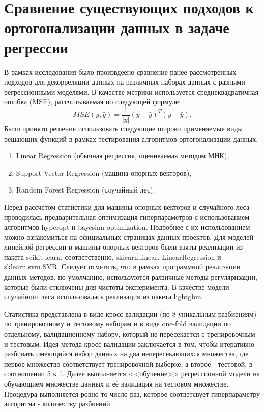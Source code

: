 \documentclass[runningheads]{llncs}
\begin{document}
\newpage
\section*{Сравнение существующих подходов к ортогонализации данных в задаче регрессии}
\hspace{0.4cm}
В рамках исследования было произвдеено сравнение ранее рассмотренных подходов для декорреляции данных на различных наборах данных с разными регрессионными моделями. В качестве метрики используется среднеквадратичная ошибка (MSE), рассчитываемая по следующей формуле: $$MSE(y, \hat{y}) = \frac{1}{|y|}(y - \hat{y})^T(y - \hat{y}).$$ Было принято решение использовать следующие широко применяемые виды решающих функций в рамках тестирования алгоритмов ортогонализации данных, \par
\begin{enumerate}
  \item Linear Regression (обычная регрессия, оцениваемая методом МНК), 
  \item Support Vector Regression (машина опорных векторов),
  \item Random Forest Regression (случайный лес).
\end{enumerate}

Перед рассчетом статистики для машины опорных векторов и случайного леса проводилась предварительная оптимизация гиперпараметров с использованием алгоритмов hyperopt и bayesian-optimization. Подробнее с их использованием можно ознакомиться на официальных страницах данных проектов. Для моделей линейной регрессии и машины опорных векторов были взяты реализации из пакета scikit-learn, соответственно, sklearn.linear. LinearRegression и sklearn.svm.SVR. Следует отметить, что в рамках программной реализации данных методов, по умолчанию, используются ралзичные методы регуляризации, которые были отключены для чистоты эксперимента. В качестве модели случайного леса использовалась реализация из пакета lightgbm.\par

Статистика представлена в виде кросс-валидации (по 8 уникальным разбиениям) по тренировочному и тестовому наборам и в виде one-fold валидации по отдельному, валидационному набору, который не пересекается с тренировочным и тестовым. Идея метода кросс-валидации заключается в том, чтобы итеративно разбивать имеющийся набор данных на два непересекающихся множества, где первое множество соответствует тренировочной выборке, а второе - тестовой, в соотношении 5 к 1. Далее выполняется <<обучение>> регрессионной модели на обучающием множестве данных и её валидация на тестовом множестве. Процедура выполняется ровно то число раз, которое соответсвует гиперпараметру алгоритма - количеству разбиений. \par
\end{document}
